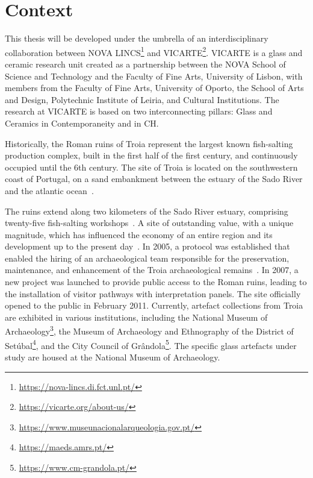 \section{Context}
\label{sec:context}

This thesis will be developed under the umbrella of an interdisciplinary collaboration between NOVA LINCS\footnote{\url{https://nova-lincs.di.fct.unl.pt/}} and \gls{VICARTE}\footnote{\url{https://vicarte.org/about-us/}}.
\gls{VICARTE} is a glass and ceramic research unit created as a partnership between the NOVA School of Science and Technology and the Faculty of Fine Arts, University of Lisbon, with members from the Faculty of Fine Arts, University of Oporto, the School of Arts and Design, Polytechnic Institute of Leiria, and Cultural Institutions.
The research at \gls{VICARTE} is based on two interconnecting pillars: Glass and Ceramics in Contemporaneity and in \gls{CH}. 

Historically, the Roman ruins of Troia represent the largest known fish-salting production complex, built in the first half of the first century, and continuously occupied until the 6th century. 
The site of Troia is located on the southwestern coast of Portugal, on a sand embankment between the estuary of the Sado River and the atlantic ocean~\cite{pinto2018reassessment}.

The ruins extend along two kilometers of the Sado River estuary, comprising twenty-five fish-salting workshops~\cite{hocquet2015fish}.
A site of outstanding value, with a unique magnitude, which has influenced the economy of an entire region and its development up to the present day~\cite{unesco_troia}.
In 2005, a protocol was established that enabled the hiring of an archaeological team responsible for the preservation, maintenance, and enhancement of the Troia archaeological remains~\cite{pinto2014ruinas}. In 2007,
a new project was launched to provide public access to the Roman ruins, leading to the installation of visitor pathways with interpretation panels. The site officially opened to the public in February 2011. 
Currently, artefact collections from Troia are exhibited in various institutions, including the National Museum of Archaeology\footnote{\url{https://www.museunacionalarqueologia.gov.pt/}}, the Museum of Archaeology and Ethnography of the District of Setúbal\footnote{\url{https://maeds.amrs.pt/}}, and the City Council of Grândola\footnote{\url{https://www.cm-grandola.pt/}}. The specific glass artefacts under study are housed at the National Museum of Archaeology.



